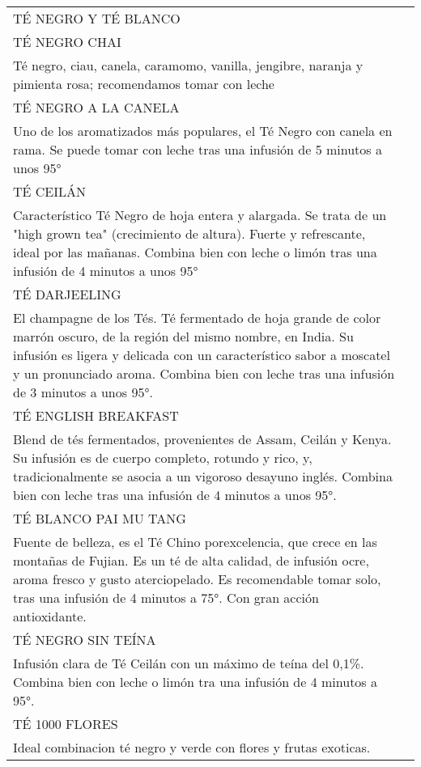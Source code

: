 \documentclass[8pt]{article}
\makeatletter
\newcommand*\ColText[1]{\textcolor{Goldenrod3}{#1}}
\newenvironment{Group}[1]
{\noindent\begin{tabular*}{\textwidth}{@{}p{1\linewidth}@{\extracolsep{\fill}}r@{}}
{\fontsize{24}{29}\selectfont\ColText{#1}}
              \\[0.8em]}
              {
\end{tabular*}}
\newcommand*\Entry[1]{%
    \sffamily#1}
\newcommand*\Expl[1]{%
    \hspace*{1em}\footnotesize #1}
\makeatother
\begin{document}
    \vfill
    \begin{Group}{TÉ NEGRO Y TÉ BLANCO}
        \Entry{TÉ NEGRO CHAI} \\
        \Expl{Té negro, ciau, canela, caramomo, vanilla, jengibre, naranja y pimienta rosa; recomendamos tomar con leche} \\
        \Entry{TÉ NEGRO A LA CANELA} \\
        \Expl{Uno de los aromatizados más populares, el Té Negro con canela en rama. Se puede tomar con leche tras una infusión de 5 minutos a unos 95°} \\
        \Entry{TÉ CEILÁN} \\
        \Expl{Característico Té Negro de hoja entera y alargada. Se trata de un "high grown tea" (crecimiento de altura). Fuerte y refrescante, ideal por las mañanas. Combina bien con leche o limón tras una infusión de 4 minutos a unos 95°} \\
        \Entry{TÉ DARJEELING} \\
        \Expl{El champagne de los Tés. Té fermentado de hoja grande de color marrón oscuro, de la región del mismo nombre, en India. Su infusión es ligera y delicada con un característico sabor a moscatel y un pronunciado aroma. Combina bien con leche tras una infusión de 3 minutos a unos 95°. } \\
        \Entry{TÉ ENGLISH BREAKFAST} \\
        \Expl{Blend de tés fermentados, provenientes de Assam, Ceilán y Kenya. Su infusión es de cuerpo completo, rotundo y rico, y, tradicionalmente se asocia a un vigoroso desayuno inglés. Combina bien con leche tras una infusión de 4 minutos a unos 95°.} \\
        \Entry{TÉ BLANCO PAI MU TANG} \\
        \Expl{Fuente de belleza, es el Té Chino porexcelencia, que crece en las montañas de Fujian. Es un té de alta calidad, de infusión ocre, aroma fresco y gusto aterciopelado. Es recomendable tomar solo, tras una infusión de 4 minutos a 75°. Con gran acción antioxidante.} \\
        \Entry{TÉ NEGRO SIN TEÍNA} \\
        \Expl{Infusión clara de Té Ceilán con un máximo de teína del 0,1\%. Combina bien con leche o limón tra una infusión de 4 minutos a 95°.} \\
        \Entry{TÉ 1000 FLORES} \\
        \Expl{Ideal combinacion té negro y verde con flores y frutas exoticas.} \\

\end{Group}
\end{document}
